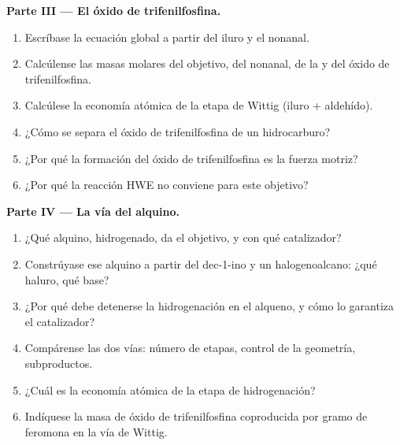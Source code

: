 \begin{problem}
\medskip
\noindent\textbf{Parte III --- El óxido de trifenilfosfina.}
\begin{enumerate}[resume]
  \item Escríbase la ecuación global a partir del iluro y el nonanal.
  \item Calcúlense las masas molares del objetivo, del nonanal, de la  y del
        óxido de trifenilfosfina.
  \item Calcúlese la economía atómica de la etapa de Wittig (iluro + aldehído).
  \item ¿Cómo se separa el óxido de trifenilfosfina de un hidrocarburo?
  \item ¿Por qué la formación del óxido de trifenilfosfina es la fuerza motriz?
  \item ¿Por qué la reacción HWE no conviene para este objetivo?
\end{enumerate}

\medskip
\noindent\textbf{Parte IV --- La vía del alquino.}
\begin{enumerate}[resume]
  \item ¿Qué alquino, hidrogenado, da el objetivo, y con qué catalizador?
  \item Constrúyase ese alquino a partir del dec-1-ino y un halogenoalcano: ¿qué haluro, qué base?
  \item ¿Por qué debe detenerse la hidrogenación en el alqueno, y cómo lo garantiza el catalizador?
  \item Compárense las dos vías: número de etapas, control de la geometría, subproductos.
  \item ¿Cuál es la economía atómica de la etapa de hidrogenación?
  \item Indíquese la masa de óxido de trifenilfosfina coproducida por gramo de feromona en la vía de
        Wittig.
\end{enumerate}
\end{problem}
